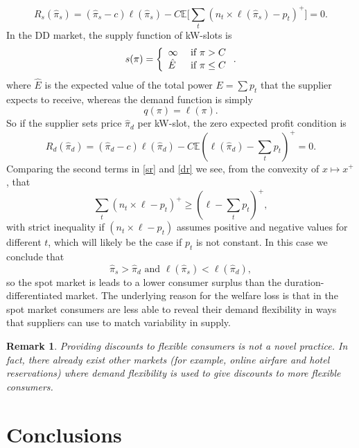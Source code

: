 \documentclass[10pt,draftcls,onecolumn]{IEEEtran}
\newtheorem{remark}{Remark}
\newcounter{l1}
\newcounter{l2}
\newcounter{l3}
\newcommand{\expec}{\mathbb{E}}
\begin{document}
\begin{equation}
R_s(\hat{\pi}_s) =(\hat{\pi}_s -c)  \ell(\hat{\pi}_s)-C \expec \big[\sum_t (n_t \times \ell(\hat{\pi}_s)-p_t)^+ \big]= 0.\label{sr}
\end{equation}
In the DD market, the supply function of kW-slots is
\begin{equation} \notag
s (\pi ) = \left\{
\begin{array}{ll}
\infty & \mbox{ if } \pi > C \\
\hat{E}  & \mbox{ if } \pi \le C
\end{array}
\right . .
\end{equation}
where $\hat{E}$ is the expected value of the total power $E = \sum p_t$ that the supplier expects to receive, whereas the demand function is simply 
\[q(\pi) = \ell (\pi).\]
So if the supplier sets  price $\hat{\pi}_d$ per kW-slot, the zero expected profit condition   is 
\begin{equation}
R_d(\hat{\pi}_d) = (\hat{\pi}_d -c) {\ell} (\hat{\pi}_d) -C \expec ({\ell}(\hat{\pi}_d)-\sum_t p_t)^+ = 0. \label{dr}
\end{equation}
Comparing the second terms in \eqref{sr} and \eqref{dr} we see, from the convexity of $x \mapsto x^+$, that 
\[ \sum_t (n_t \times \ell -p_t)^+ \ge  ({\ell}-\sum_t p_t)^+,\]
with strict inequality if $(n_t \times \ell -p_t)$ assumes positive and negative values for different $t$, which will likely be the case if
$p_t$ is not constant.  In this case we conclude that
\[\hat{\pi}_s > \hat{\pi}_d \mbox{  and } \ell(\hat{\pi}_s) < \ell (\hat{\pi}_d),\]
so the spot market is leads to a lower consumer surplus than the duration-differentiated market.  The underlying reason for the welfare loss is that in the spot market consumers are less able to reveal their demand flexibility in ways that suppliers can use to match variability in supply.
\begin{remark}
Providing discounts to flexible consumers is not a novel practice. In fact, there already exist other markets (for example, online airfare and hotel reservations) where demand flexibility is used to give discounts to more flexible consumers.
\end{remark}
\section{Conclusions} \label{sec-conclusions}
\end{document}
